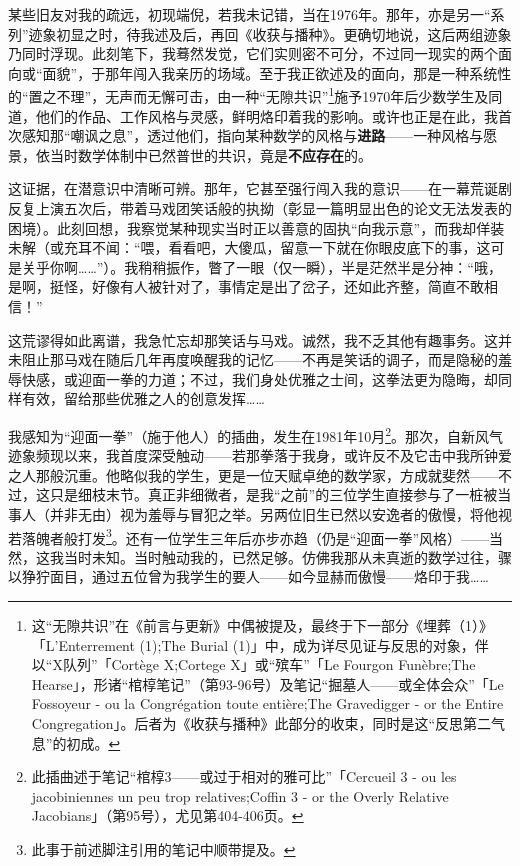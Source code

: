 某些旧友对我的疏远，初现端倪，若我未记错，当在1976年。那年，亦是另一``系列''迹象初显之时，待我述及后，再回《收获与播种》。更确切地说，这后两组迹象乃同时浮现。此刻笔下，我蓦然发觉，它们实则密不可分，不过同一现实的两个面向或``面貌''，于那年闯入我亲历的场域。至于我正欲述及的面向，那是一种系统性的``置之不理''，无声而无懈可击，由一种``无隙共识''\footnote{这``无隙共识''在《前言与更新》中偶被提及，最终于下一部分《埋葬（1）》「L'Enterrement (1);The Burial (1)」中，成为详尽见证与反思的对象，伴以``X队列''「Cortège X;Cortege X」或``殡车''「Le Fourgon Funèbre;The Hearse」，形诸``棺椁笔记''（第93-96号）及笔记“掘墓人——或全体会众”「Le Fossoyeur - ou la Congrégation toute entière;The Gravedigger - or the Entire Congregation」。后者为《收获与播种》此部分的收束，同时是这``反思第二气息''的初成。}施予1970年后少数学生及同道，他们的作品、工作风格与灵感，鲜明烙印着我的影响。或许也正是在此，我首次感知那“嘲讽之息”，透过他们，指向某种数学的风格与\textbf{进路}——一种风格与愿景，依当时数学体制中已然普世的共识，竟是\textbf{不应存在}的。

这证据，在潜意识中清晰可辨。那年，它甚至强行闯入我的意识——在一幕荒诞剧反复上演五次后，带着马戏团笑话般的执拗（彰显一篇明显出色的论文无法发表的困境）。此刻回想，我察觉某种现实当时正以善意的固执“向我示意”，而我却佯装未解（或充耳不闻：“喂，看看吧，大傻瓜，留意一下就在你眼皮底下的事，这可是关乎你啊……”）。我稍稍振作，瞥了一眼（仅一瞬），半是茫然半是分神：“哦，是啊，挺怪，好像有人被针对了，事情定是出了岔子，还如此齐整，简直不敢相信！” 

这荒谬得如此离谱，我急忙忘却那笑话与马戏。诚然，我不乏其他有趣事务。这并未阻止那马戏在随后几年再度唤醒我的记忆——不再是笑话的调子，而是隐秘的羞辱快感，或迎面一拳的力道；不过，我们身处优雅之士间，这拳法更为隐晦，却同样有效，留给那些优雅之人的创意发挥……

我感知为“迎面一拳”（施于他人）的插曲，发生在1981年10月\footnote{此插曲述于笔记“棺椁3——或过于相对的雅可比”「Cercueil 3 - ou les jacobiniennes un peu trop relatives;Coffin 3 - or the Overly Relative Jacobians」（第95号），尤见第404-406页。}。那次，自新风气迹象频现以来，我首度深受触动——若那拳落于我身，或许反不及它击中我所钟爱之人那般沉重。他略似我的学生，更是一位天赋卓绝的数学家，方成就斐然——不过，这只是细枝末节。真正非细微者，是我“之前”的三位学生直接参与了一桩被当事人（并非无由）视为羞辱与冒犯之举。另两位旧生已然以安逸者的傲慢，将他视若落魄者般打发\footnote{此事于前述脚注引用的笔记中顺带提及。}。还有一位学生三年后亦步亦趋（仍是“迎面一拳”风格）——当然，这我当时未知。当时触动我的，已然足够。仿佛我那从未真逝的数学过往，骤以狰狞面目，通过五位曾为我学生的要人——如今显赫而傲慢——烙印于我……

